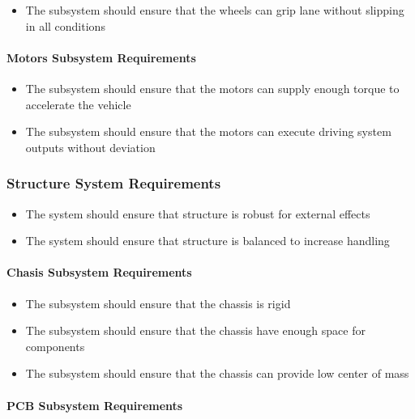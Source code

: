 \documentclass[a4paper,12pt]{article}
\begin{document}
		\begin{itemize}
			\item The subsystem should ensure that the wheels can grip lane without slipping in all conditions 	
		\end{itemize}
		
	\paragraph{Motors Subsystem Requirements}
	
		\begin{itemize}
			\item The subsystem should ensure that the motors can supply enough torque to accelerate the vehicle		
			\item  The subsystem should ensure that the motors can execute driving system outputs without deviation 
		\end{itemize}
	
	
	\subsubsection{Structure System Requirements}
	
		\begin{itemize}
			\item The system should	ensure that structure is robust for external effects 
			\item The system should	ensure that structure is balanced to increase handling
	
		\end{itemize}
	
	\paragraph{Chasis Subsystem Requirements}	
		
			\begin{itemize}
			\item The subsystem should ensure that the chassis is rigid 
			\item The subsystem should ensure that the chassis have enough space for components
			\item The subsystem should ensure that the chassis can provide low center of mass 

		\end{itemize}
		
	\paragraph{PCB Subsystem Requirements}
	
\end{document}

